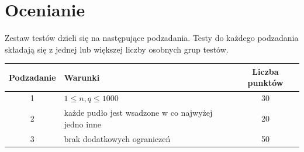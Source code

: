 \documentclass[10pt]{article}
\begin{document}

    \section*{Ocenianie}
        
    Zestaw testów dzieli się na następujące podzadania. Testy do każdego podzadania składają się z jednej lub większej liczby osobnych grup testów.
    
    \begin{center}
        \begin{tabular}{ |c|p{9cm}|c| }
            \hline
            \textbf{Podzadanie} & \textbf{Warunki} & \textbf{Liczba punktów}\\
            \hline
            1 & $1 \leq n, q \leq 1000$ & 30\\
            \hline
            2 & każde pudło jest wsadzone w co najwyżej jedno inne & 20\\
            \hline
            3 & brak dodatkowych ograniczeń & 50\\
            \hline
        \end{tabular}
    \end{center}
\end{document}
